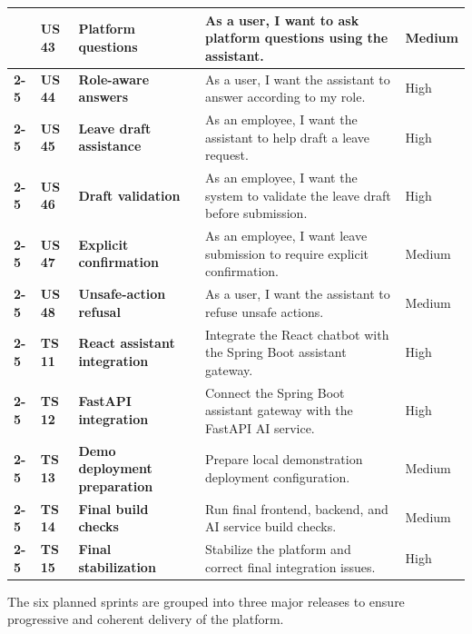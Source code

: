 \begin{longtable}{|>{\centering\bfseries}m{2.55cm}|>{\centering\bfseries}m{0.9cm}|>{\centering\bfseries}m{3.05cm}|m{6.75cm}|>{\centering\arraybackslash}m{1.45cm}|}
& US 43 & Platform questions & As a user, I want to ask platform questions using the assistant. & Medium \\
\cline{2-5}
& US 44 & Role-aware answers & As a user, I want the assistant to answer according to my role. & High \\
\cline{2-5}
& US 45 & Leave draft assistance & As an employee, I want the assistant to help draft a leave request. & High \\
\cline{2-5}
& US 46 & Draft validation & As an employee, I want the system to validate the leave draft before submission. & High \\
\cline{2-5}
& US 47 & Explicit confirmation & As an employee, I want leave submission to require explicit confirmation. & Medium \\
\cline{2-5}
& US 48 & Unsafe-action refusal & As a user, I want the assistant to refuse unsafe actions. & Medium \\
\cline{2-5}
& TS 11 & React assistant integration & Integrate the React chatbot with the Spring Boot assistant gateway. & High \\
\cline{2-5}
& TS 12 & FastAPI integration & Connect the Spring Boot assistant gateway with the FastAPI AI service. & High \\
\cline{2-5}
& TS 13 & Demo deployment preparation & Prepare local demonstration deployment configuration. & Medium \\
\cline{2-5}
& TS 14 & Final build checks & Run final frontend, backend, and AI service build checks. & Medium \\
\cline{2-5}
& TS 15 & Final stabilization & Stabilize the platform and correct final integration issues. & High \\
\hline
\end{longtable}

\normalsize
\setlength{\tabcolsep}{6pt}

\vspace{6pt}

  {\fontsize{12}{18}\selectfont
  \setlength{\parindent}{1.2cm}
  \setlength{\parskip}{6pt}

  \indent The six planned sprints are grouped into three major releases to ensure progressive and coherent delivery of the platform.

  }

